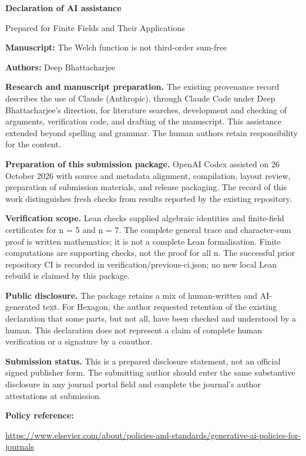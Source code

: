 \documentclass[11pt]{article}
\begin{document}
{\Large\bfseries Declaration of AI assistance}\par
Prepared for Finite Fields and Their Applications

\textbf{Manuscript:} The Welch function is not third-order sum-free\par
\textbf{Authors:} Deep Bhattacharjee

\textbf{Research and manuscript preparation.}
The existing provenance record describes the use of Claude (Anthropic), through Claude Code under Deep Bhattacharjee's direction, for literature searches, development and checking of arguments, verification code, and drafting of the manuscript. This assistance extended beyond spelling and grammar. The human authors retain responsibility for the content.

\textbf{Preparation of this submission package.}
OpenAI Codex assisted on 26 October 2026 with source and metadata alignment, compilation, layout review, preparation of submission materials, and release packaging. The record of this work distinguishes fresh checks from results reported by the existing repository.

\textbf{Verification scope.}
Lean checks supplied algebraic identities and finite-field certificates for n = 5 and n = 7. The complete general trace and character-sum proof is written mathematics; it is not a complete Lean formalisation. Finite computations are supporting checks, not the proof for all n. The successful prior repository CI is recorded in verification/previous-ci.json; no new local Lean rebuild is claimed by this package.

\textbf{Public disclosure.}
The package retains a mix of human-written and AI-generated text. For Hexagon, the author requested retention of the existing declaration that some parts, but not all, have been checked and understood by a human. This declaration does not represent a claim of complete human verification or a signature by a coauthor.

\textbf{Submission status.}
This is a prepared disclosure statement, not an official signed publisher form. The submitting author should enter the same substantive disclosure in any journal portal field and complete the journal's author attestations at submission.

\textbf{Policy reference:}\par
\url{https://www.elsevier.com/about/policies-and-standards/generative-ai-policies-for-journals}
\end{document}

